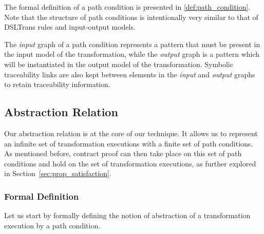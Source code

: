 The formal definition of a path condition is presented in \cref{def:path_condition}. Note that the structure of path conditions is intentionally very similar to that of DSLTrans rules and input-output models.

The \textit{input} graph of a path condition represents a pattern that must be present in the input model of the transformation, while the \textit{output} graph is a pattern which will be instantiated in the output model of the transformation. Symbolic traceability links are also kept between elements in the \textit{input} and \textit{output} graphs to retain traceability information.





\subsection{Abstraction Relation}
\label{subsec:abstraction_relation}

Our abstraction relation is at the core of our technique. It allows us to represent an infinite set of transformation executions with a finite set of path conditions. As mentioned before, contract proof can then take place on this set of path conditions and hold on the set of transformation executions, as further explored in Section~\ref{sec:prop_satisfaction}.


\subsubsection{Formal Definition}
\label{subsubsec:abstraction_relation_formal}
Let us start by formally defining the notion of abstraction of a transformation execution by a path condition.

